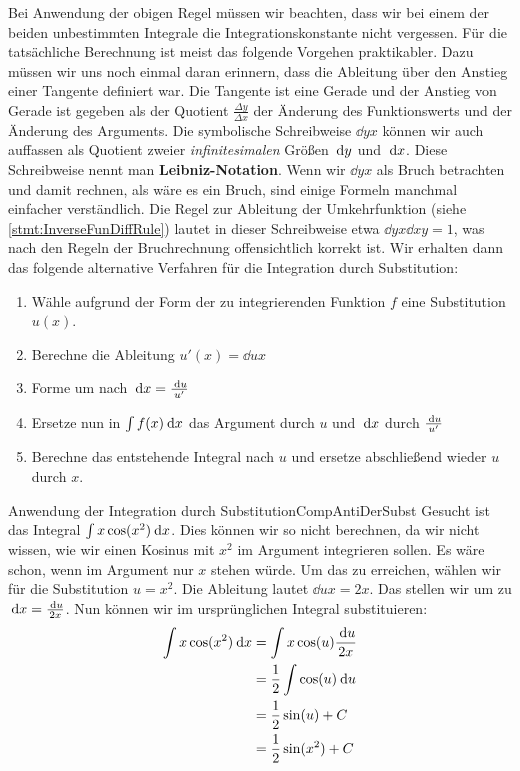 Bei Anwendung der obigen Regel müssen wir beachten, dass wir bei einem der beiden unbestimmten Integrale die Integrationskonstante nicht vergessen. Für die tatsächliche Berechnung ist meist das folgende Vorgehen praktikabler. Dazu müssen wir uns noch einmal daran erinnern, dass die Ableitung über den Anstieg einer Tangente definiert war. Die Tangente ist eine Gerade und der Anstieg von Gerade ist gegeben als der Quotient $\frac{\Delta y}{\Delta x}$ der Änderung des Funktionswerts und der Änderung des Arguments. Die symbolische Schreibweise $\dd{y}{x}$ können wir auch auffassen als Quotient zweier \emph{infinitesimalen} Größen $\:\mathrm{d}{y}$ und $\:\mathrm{d}{x}$. Diese Schreibweise nennt man \textbf{Leibniz-Notation}. Wenn wir $\dd{y}{x}$ als Bruch betrachten und damit rechnen, als wäre es ein Bruch, sind einige Formeln manchmal einfacher verständlich. Die Regel zur Ableitung der Umkehrfunktion (siehe \ref{stmt:InverseFunDiffRule}) lautet in dieser Schreibweise etwa $\dd{y}{x} \dd{x}{y} = 1$, was nach den Regeln der Bruchrechnung offensichtlich korrekt ist. Wir erhalten dann das folgende alternative Verfahren für die Integration durch Substitution:

\begin{enumerate}
    \item Wähle aufgrund der Form der zu integrierenden Funktion $f$ eine Substitution $u(x)$.
    \item Berechne die Ableitung $u'(x) = \dd{u}{x}$
    \item Forme um nach $\:\mathrm{d}{}{x} = \frac{\:\mathrm{d}{u}}{u'}$
    \item Ersetze nun in $\int f(x) \:\mathrm{d}{x}$ das Argument durch $u$ und $\:\mathrm{d}{x}$ durch $\frac{\:\mathrm{d}{u}}{u'}$
    \item Berechne das entstehende Integral nach $u$ und ersetze abschließend wieder $u$ durch $x$.
\end{enumerate}

\begin{example}{Anwendung der Integration durch Substitution}{CompAntiDerSubst}
    Gesucht ist das Integral $\int x \cos(x^2) \:\mathrm{d}{x}$. Dies können wir so nicht berechnen, da wir nicht wissen, wie wir einen Kosinus mit $x^2$ im Argument integrieren sollen. Es wäre schon, wenn im Argument nur $x$ stehen würde. Um das zu erreichen, wählen wir für die Substitution $u = x^2$. Die Ableitung lautet $\dd{u}{x} = 2x$. Das stellen wir um zu $\:\mathrm{d}{x} = \frac{\:\mathrm{d}{u}}{2x}$. Nun können wir im ursprünglichen Integral substituieren:
    \begin{alignat*}{1}
        \int x \cos(x^2) \:\mathrm{d}{x} &= \int x \cos(u) \frac{\:\mathrm{d}{u}}{2x} \\
                                  &= \frac{1}{2} \int \cos(u) \:\mathrm{d}{u} \\
                                  &= \frac{1}{2} \sin(u) + C \\
                                  &= \frac{1}{2} \sin(x^2) + C
    \end{alignat*}
\end{example}

